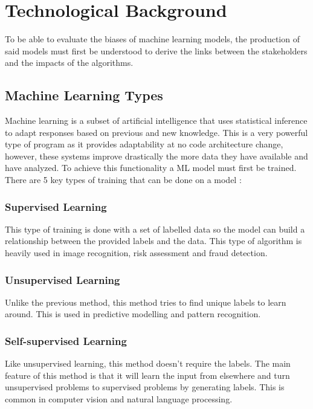 \section{Technological Background}
To be able to evaluate the biases of machine learning models, the production of said models must first be understood to derive the links between the stakeholders and the impacts of the algorithms.

\subsection{Machine Learning Types}
Machine learning is a subset of artificial intelligence that uses statistical inference to adapt responses based on previous and new knowledge. This is a very powerful type of program as it provides adaptability at no code architecture change, however, these systems improve drastically the more data they have available and have analyzed. To achieve this functionality a ML model must first be trained. There are 5 key types of training that can be done on a model \cite{IBM-MachineLearningTypes}:

\subsubsection{Supervised Learning}
This type of training is done with a set of labelled data so the model can build a relationship between the provided labels and the data. This type of algorithm is heavily used in image recognition, risk assessment and fraud detection. \cite{SupervisedLearning}

\subsubsection{Unsupervised Learning}
Unlike the previous method, this method tries to find unique labels to learn around. This is used in predictive modelling and pattern recognition. \cite{UnsupervisedLearning}

\subsubsection{Self-supervised Learning}
Like unsupervised learning, this method doesn't require the labels. The main feature of this method is that it will learn the input from elsewhere and turn unsupervised problems to supervised problems by generating labels. This is common in computer vision and natural language processing. \cite{Self-SupervisedLearning}


